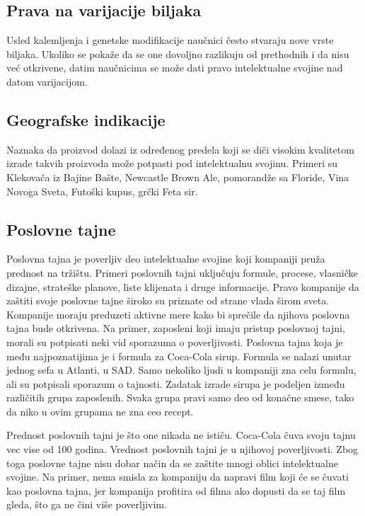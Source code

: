 \documentclass[a4paper]{article}
\begin{document}
\subsection{Prava na varijacije biljaka}
\label{subsec:granje}

Usled kalemljenja i genetske modifikacije naučnici često stvaraju nove vrste biljaka. Ukoliko se pokaže da se one dovoljno razlikuju od prethodnih i da nisu već otkrivene, datim naučnicima se može dati pravo intelektualne svojine nad datom varijacijom.

\newpage

\subsection{Geografske indikacije}
\label{subsec:geo}

Naznaka da proizvod dolazi iz određenog predela koji se diči visokim kvalitetom izrade takvih proizvoda može potpasti pod intelektualnu svojinu. Primeri su Klekovača iz Bajine Bašte, Newcastle Brown Ale, pomorandže sa Floride, Vina Novoga Sveta, Futoški kupus, grčki Feta sir.

\subsection{Poslovne tajne}
\label{subsec:poslovne}

Poslovna tajna je poverljiv deo intelektualne svojine koji kompaniji pruža prednost na tržištu. Primeri poslovnih tajni uključuju formule, procese, vlasničke dizajne, strateške planove, liste klijenata i druge informacije. Pravo kompanije da zaštiti svoje poslovne tajne široko su priznate od strane vlada širom sveta. Kompanije moraju preduzeti aktivne mere kako bi sprečile da njihova poslovna tajna bude otkrivena. Na primer, zaposleni koji imaju pristup poslovnoj tajni, morali su potpisati neki vid sporazuma o poverljivosti. Poslovna tajna koja je među najpoznatijima je i formula za Coca-Cola sirup. Formula se nalazi unutar jednog sefa u Atlanti, u SAD. Samo nekoliko ljudi u kompaniji zna celu formulu, ali su potpisali sporazum o tajnosti. Zadatak izrade sirupa je podeljen između različitih grupa zaposlenih. Svaka grupa pravi samo deo od konačne smese, tako da niko u ovim grupama ne zna ceo recept.

Prednost poslovnih tajni je što one nikada ne ističu. Coca-Cola čuva svoju tajnu vec vise od 100 godina.
Vrednost poslovnih tajni je u njihovoj poverljivosti. Zbog toga poslovne tajne nisu dobar način da se zaštite mnogi oblici intelektualne svojine. Na primer, nema smisla za kompaniju da napravi film koji će se čuvati kao poslovna tajna, jer kompanija profitira od filma ako dopusti da se taj film gleda, što ga ne čini više poverljivim.
\end{document}
